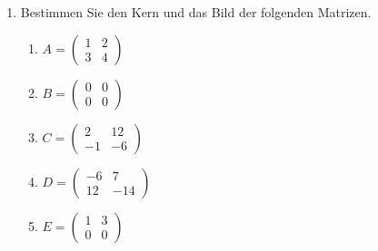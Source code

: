 \begin{ueb}
    {}{}

\begin{enumerate}
  \item Bestimmen Sie den Kern und das Bild der folgenden Matrizen.  
  \begin{enumerate}
    \item \( A = \begin{pmatrix} 1 & 2 \\ 3 & 4 \end{pmatrix} \)
    \item \( B = \begin{pmatrix} 0 & 0 \\ 0 & 0 \end{pmatrix} \)
    \item \( C = \begin{pmatrix} 2 & 12 \\ -1 & -6 \end{pmatrix} \)
    \item \( D = \begin{pmatrix} -6 & 7 \\ 12 & -14 \end{pmatrix} \)
    \item \( E = \begin{pmatrix} 1 & 3 \\ 0 & 0 \end{pmatrix} \)
  \end{enumerate}


\end{enumerate}
\end{ueb}
